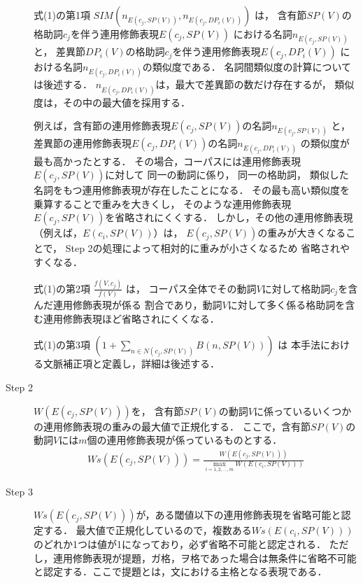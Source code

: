 \begin{description}
式(1)の第1項
$SIM(n_{E(c_{j},SP(V))},n_{E(c_{j},DP_{i}(V))})$
は，
含有節$SP(V)$の格助詞$c_{j}$を伴う連用修飾表現$E(c_{j},SP(V))$
における名詞$n_{E(c_{j},SP(V))}$と，
差異節$DP_{i}(V)$の格助詞$c_{j}$を伴う連用修飾表現$E(c_{j},DP_{i}(V))$
における名詞$n_{E(c_{j},DP_{i}(V))}$の類似度である．
名詞間類似度の計算については後述する．
$n_{E(c_{j},DP_{i}(V))}$は，最大で差異節の数だけ存在するが，
類似度は，その中の最大値を採用する．

例えば，含有節の連用修飾表現$E(c_{j},SP(V))$の名詞$n_{E(c_{j},SP(V))}$
と，差異節の連用修飾表現$E(c_{j},DP_{i}(V))$の名詞$n_{E(c_{j},DP_{i}(V))}$
の類似度が最も高かったとする．
その場合，コーパスには連用修飾表現$E(c_{j},SP(V))$に対して
同一の動詞に係り，
同一の格助詞，
類似した名詞をもつ連用修飾表現が存在したことになる．
その最も高い類似度を乗算することで重みを大きくし，
そのような連用修飾表現$E(c_{j},SP(V))$を省略されにくくする．
しかし，その他の連用修飾表現（例えば，$E(c_{i},SP(V))$）は，
$E(c_{j},SP(V))$の重みが大きくなることで，
Step 2の処理によって相対的に重みが小さくなるため
省略されやすくなる．

式(1)の第2項 $\frac{f(V,c_{j})}{f(V)}$ は，
コーパス全体でその動詞$V$に対して格助詞$c_{j}$を含んだ連用修飾表現が係る
割合であり，動詞$V$に対して多く係る格助詞を含む連用修飾表現ほど省略されにくくなる．

式(1)の第3項 $(1+\sum_{n \in N(c_{j},SP(V))}B(n,SP(V)))$ は
本手法における文脈補正項と定義し，詳細は後述する．
  \item[Step 2] $W(E(c_{j},SP(V)))$を，
含有節$SP(V)$の動詞$V$に係っているいくつかの連用修飾表現の重みの最大値で正規化する．
ここで，含有節$SP(V)$の動詞$V$には$m$個の連用修飾表現が係っているものとする．
\begin{eqnarray}
  Ws(E(c_{j},SP(V))) = \frac{W(E(c_{j},SP(V)))}{ \max_{i=1,2,\dots,m} W(E(c_{i},SP(V)))}
\end{eqnarray}
  \item[Step 3] $Ws(E(c_{j},SP(V)))$が，ある閾値以下の連用修飾表現を省略可能と認定する．
最大値で正規化しているので，複数ある$Ws(E(c_{i},SP(V)))$のどれか1つは値が1になっており，必ず省略不可能と認定される．
ただし，連用修飾表現が提題，ガ格，ヲ格であった場合は無条件に省略不可能と認定する．ここで提題とは，文における主格となる表現である．
\end{description}
